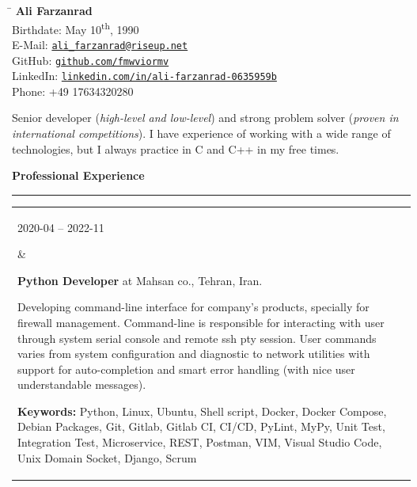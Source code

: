 \documentclass[11pt,a4paper,oneside]{article}
\makeatletter
\newcommand{\https}[1]{\href{https://#1}{\nolinkurl{#1}}}
\newcommand{\mailto}[1]{\href{mailto://#1}{\nolinkurl{#1}}}
\newcommand{\keywords}[1]{\textbf{Keywords:} #1}
\renewcommand{\section}[1]{%
{\large\textbf{#1}}\\
\rule[9pt]{18cm}{.4pt}\vspace{-16pt}%
}
\newenvironment{mytable}{%
\begin{tabular}{@{}l@{\hspace{4mm}}l@{}}%
}{\end{tabular}}
\newcommand{\myitem}[2]{%
\parbox[t]{16mm}{#1}&\parbox[t]{16cm}{#2}\\%
}
\makeatother
\begin{document}
%
%
\hspace{1cm}%
\parbox{13cm}{%
\begin{tabbing}%
\hspace{3cm}\=\kill%
\textbf{{\LARGE Ali Farzanrad}}\\[5mm]
Birthdate: \>
May 10\textsuperscript{th}, 1990\\[1mm]
E-Mail: \>
\mailto{ali_farzanrad@riseup.net}\\[1mm]
GitHub: \>
\https{github.com/fmwviormv}\\[1mm]
LinkedIn: \>
\https{linkedin.com/in/ali-farzanrad-0635959b}\\[1mm]
Phone: \>
+49{ }17634320280\\
\end{tabbing}%
}

\vspace{-9pt}%
Senior developer (\textit{high-level and low-level}) and strong
problem solver (\textit{proven in international competitions}).
I have experience of working with a wide range of technologies,
but I always practice in C and C++ in my free times.

\section{Professional Experience}

\begin{mytable}
\myitem{2020-04 -- 2022-11}{%
\textbf{Python Developer} at
Mahsan co., Tehran, Iran.

Developing command-line interface for company's products,
specially for firewall management.
Command-line is responsible for interacting with user through
system serial console and remote ssh pty session.
User commands varies from system configuration and diagnostic
to network utilities with support for auto-completion and
smart error handling (with nice user understandable messages).

\keywords{%
	Python, Linux, Ubuntu, Shell script, Docker, Docker Compose,
	Debian Packages, Git, Gitlab, Gitlab CI, CI/CD, PyLint, MyPy,
	Unit Test, Integration Test, Microservice, REST, Postman,
	VIM, Visual Studio Code, Unix Domain Socket, Django, Scrum
}
}
\end{mytable}
\end{document}
